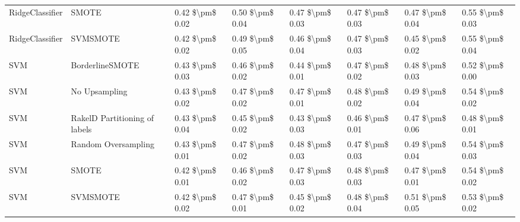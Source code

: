 \begin{tabular}{llllllll}
                RidgeClassifier &                         SMOTE & 0.42 \$\textbackslash pm\$ 0.02 &           0.50 \$\textbackslash pm\$ 0.04 &       0.47 \$\textbackslash pm\$ 0.03 &        0.47 \$\textbackslash pm\$ 0.03 &                         0.47 \$\textbackslash pm\$ 0.04 &     0.55 \$\textbackslash pm\$ 0.03 \\
                RidgeClassifier &                      SVMSMOTE & 0.42 \$\textbackslash pm\$ 0.02 &           0.49 \$\textbackslash pm\$ 0.05 &       0.46 \$\textbackslash pm\$ 0.04 &        0.47 \$\textbackslash pm\$ 0.03 &                         0.45 \$\textbackslash pm\$ 0.02 &     0.55 \$\textbackslash pm\$ 0.04 \\
                            SVM &               BorderlineSMOTE & 0.43 \$\textbackslash pm\$ 0.03 &           0.46 \$\textbackslash pm\$ 0.02 &       0.44 \$\textbackslash pm\$ 0.01 &        0.47 \$\textbackslash pm\$ 0.02 &                         0.48 \$\textbackslash pm\$ 0.03 &     0.52 \$\textbackslash pm\$ 0.00 \\
                            SVM &                 No Upsampling & 0.43 \$\textbackslash pm\$ 0.02 &           0.47 \$\textbackslash pm\$ 0.02 &       0.47 \$\textbackslash pm\$ 0.01 &        0.48 \$\textbackslash pm\$ 0.02 &                         0.49 \$\textbackslash pm\$ 0.04 &     0.54 \$\textbackslash pm\$ 0.02 \\
                            SVM & RakelD Partitioning of labels & 0.43 \$\textbackslash pm\$ 0.04 &           0.45 \$\textbackslash pm\$ 0.02 &       0.43 \$\textbackslash pm\$ 0.03 &        0.46 \$\textbackslash pm\$ 0.01 &                         0.47 \$\textbackslash pm\$ 0.06 &     0.48 \$\textbackslash pm\$ 0.01 \\
                            SVM &           Random Oversampling & 0.43 \$\textbackslash pm\$ 0.01 &           0.47 \$\textbackslash pm\$ 0.02 &       0.48 \$\textbackslash pm\$ 0.03 &        0.47 \$\textbackslash pm\$ 0.03 &                         0.49 \$\textbackslash pm\$ 0.04 &     0.54 \$\textbackslash pm\$ 0.03 \\
                            SVM &                         SMOTE & 0.42 \$\textbackslash pm\$ 0.01 &           0.46 \$\textbackslash pm\$ 0.02 &       0.47 \$\textbackslash pm\$ 0.03 &        0.48 \$\textbackslash pm\$ 0.03 &                         0.47 \$\textbackslash pm\$ 0.01 &     0.54 \$\textbackslash pm\$ 0.02 \\
                            SVM &                      SVMSMOTE & 0.42 \$\textbackslash pm\$ 0.02 &           0.47 \$\textbackslash pm\$ 0.01 &       0.45 \$\textbackslash pm\$ 0.02 &        0.48 \$\textbackslash pm\$ 0.04 &                         0.51 \$\textbackslash pm\$ 0.05 &     0.53 \$\textbackslash pm\$ 0.02 \\

\end{tabular}

